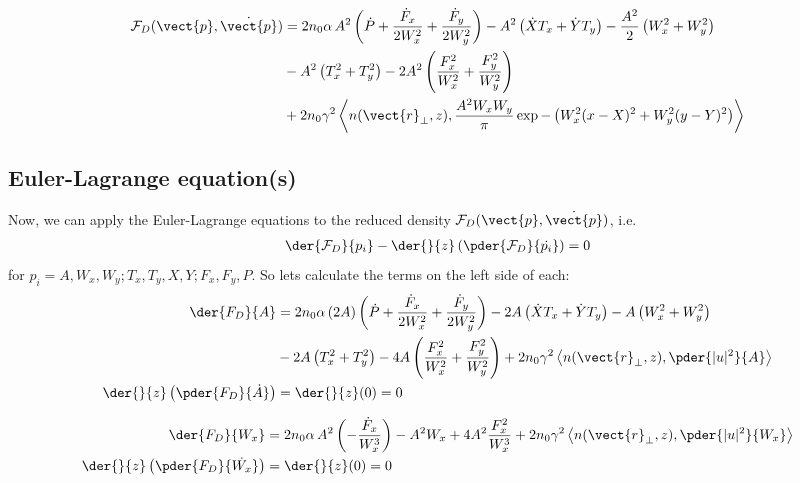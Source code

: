 \begin{equation}
    \begin{split}
    \mathcal{F}_{D}(\vect{p},\dot{\vect{p}}) & = 2 n_0 \alpha\, A^2 \left(\dot{P}  + \frac{\dot{F}_{x} }{2W_{x}^2} + \frac{\dot{F}_{y}}{2W_{y}^2} \right) - A^2 \left(\dot{X}T_x + \dot{Y} T_y\right)  - \frac{A^2}{2} \left(W_x^2+ W_y^2\right) \\
        &- A^2 \left(T_x^2 + T_y^2 \right) - 2 A^2 \left(\frac{F_{x}^2}{W_{x}^2} + \frac{F_{y}^2}{W_{y}^2}\right) \\
        &+ 2n_0 \gamma^2 \left<n(\vect{r}_{\perp},z), \frac{A^2W_x W_y}{\pi} \exp{-\left( W_x^2(x-X)^2 + W_y^2(y-Y)^2 \right)}\right>
    \end{split}
\end{equation}




\subsection{Euler-Lagrange equation(s)}
Now, we can apply the Euler-Lagrange equations to the reduced density $\mathcal{F}_{D}(\vect{p},\dot{\vect{p}})$, i.e.
\begin{equation}
\begin{split}
    \der{\mathcal{F}_{D}}{p_i}  - \der{}{z}\left(\pder{\mathcal{F}_{D}}{\dot{p_i}}\right) = 0 
\end{split}
\end{equation}
for $p_i = A, W_x,W_y; T_x, T_y, X, Y; F_x,F_y, P$.
So lets calculate the terms on the left side of each:
\begin{equation}
\begin{split}
    \der{F_{D}}{A}  &=  2 n_0 \alpha\, (2A) \left(\dot{P}  + \frac{\dot{F}_{x} }{2W_{x}^2} + \frac{\dot{F}_{y}}{2W_{y}^2} \right) - 2A  \left(\dot{X}T_x + \dot{Y} T_y\right)  - A  \left(W_x^2+ W_y^2\right) \\
        &- 2A  \left(T_x^2 + T_y^2 \right) - 4A  \left(\frac{F_{x}^2}{W_{x}^2} + \frac{F_{y}^2}{W_{y}^2}\right) +  2n_0 \gamma^2 \left< n(\vect{r}_{\perp},z),\pder{|u|^2}{A}\right>\\
    \der{}{z}\left(\pder{F_{D}}{\dot{A}}\right) &= \der{}{z}(0) = 0 \\
\end{split}
\end{equation}

\begin{equation}
\begin{split}
    \der{F_{D}}{W_x} & = 2 n_0 \alpha\, A^2 \left(  -\frac{\dot{F}_{x} }{W_{x}^3} \right)  - A^2 W_x + 4 A^2 \frac{F_{x}^2}{W_{x}^3}  + 2n_0 \gamma^2 \left<n(\vect{r}_{\perp},z), \pder{|u|^2}{W_{x}}\right>\\
\der{}{z}\left(\pder{F_{D}}{\dot{W_x}}\right) &= \der{}{z}(0) = 0 
\end{split}
\end{equation}

